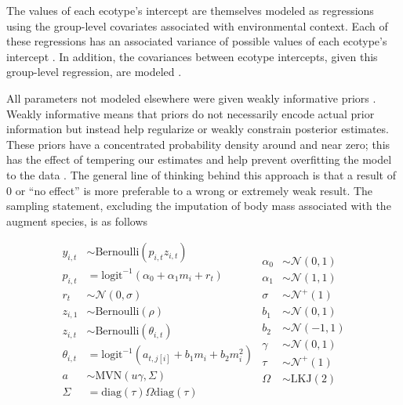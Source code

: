 \documentclass[12pt,letterpaper]{article}
\begin{document}
The values of each ecotype's intercept are themselves modeled as regressions using the group-level covariates associated with environmental context. Each of these regressions has an associated variance of possible values of each ecotype's intercept \citep{Gelman2007}. In addition, the covariances between ecotype intercepts, given this group-level regression, are modeled \citep{Gelman2007}.

All parameters not modeled elsewhere were given weakly informative priors \citep{Gelman2013d,McElreath2016,StanDevelopmentTeam2016}. Weakly informative means that priors do not necessarily encode actual prior information but instead help regularize or weakly constrain posterior estimates. These priors have a concentrated probability density around and near zero; this has the effect of tempering our estimates and help prevent overfitting the model to the data \citep{Gelman2013d,McElreath2016,StanDevelopmentTeam2016}. The general line of thinking behind this approach is that a result of 0 or ``no effect'' is more preferable to a wrong or extremely weak result. The sampling statement, excluding the imputation of body mass associated with the augment species, is as follows

\begin{equation}
  \begin{split}
    y_{i, t} &\sim \text{Bernoulli}(p_{i, t} z_{i, t}) \\
    p_{i, t} &= \text{logit}^{-1}(\alpha_{0} + \alpha_{1} m_{i} + r_{t}) \\ 
    r_{t} &\sim \mathcal{N}(0, \sigma) \\
    z_{i, 1} &\sim \text{Bernoulli}(\rho) \\
    z_{i, t} &\sim \text{Bernoulli}(\theta_{i, t}) \\
    \theta_{i, t} &= \text{logit}^{-1}(a_{t, j[i]} + b_{1} m_{i} + b_{2} m_{i}^{2}) \\
    a &\sim \text{MVN}(u \gamma, \Sigma) \\
    \Sigma &= \text{diag}(\tau) \Omega \text{diag}(\tau) \\
  \end{split}
  \begin{split}
    \alpha_{0} &\sim \mathcal{N}(0, 1) \\
    \alpha_{1} &\sim \mathcal{N}(1, 1) \\
    \sigma &\sim \mathcal{N}^{+}(1) \\
    b_{1} &\sim \mathcal{N}(0, 1) \\
    b_{2} &\sim \mathcal{N}(-1, 1) \\
    \gamma &\sim \mathcal{N}(0, 1) \\
    \tau &\sim \mathcal{N}^{+}(1) \\
    \Omega &\sim \text{LKJ}(2) \\
  \end{split}
  \label{eq:pure_presence}
\end{equation}
\end{document}
